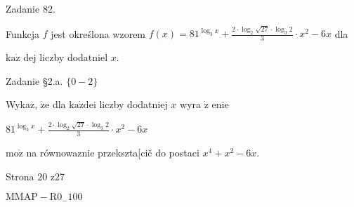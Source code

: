 \documentclass[a4paper,12pt]{article}
\begin{document}
Zadanie 82.

Funkcja $f$ jest określona wzorem $f(x)=81^{\log_{3}x}+\displaystyle \frac{2\cdot\log_{2}\sqrt{27}\cdot\log_{3}2}{3}\cdot x^{2}-6x$ dla

$\mathrm{k}\mathrm{a}\dot{\mathrm{z}}$ dej liczby dodatniel $x.$

Zadanie \S 2.a. $\{0-2\}$

Wykaz, $\dot{\mathrm{z}}\mathrm{e}$ dla $\mathrm{k}\mathrm{a}\dot{\mathrm{z}}\mathrm{d}\mathrm{e}\mathrm{i}$ liczby dodatniej $x$ wyra $\dot{\mathrm{z}}$ enie

$81^{\log_{3}x}+\displaystyle \frac{2\cdot\log_{2}\sqrt{27}\cdot\log_{3}2}{3}\cdot x^{2}-6x$

$\mathrm{m}\mathrm{o}\dot{\mathrm{z}}$ na równowaznie przekszta[cič do postaci $x^{4}+x^{2}-6x.$

Strona 20 z27

$\mathrm{M}\mathrm{M}\mathrm{A}\mathrm{P}-\mathrm{R}0_{-}100$
\end{document}
